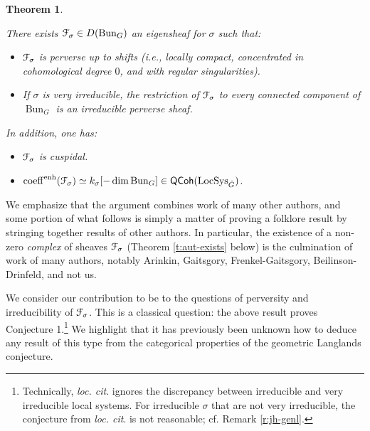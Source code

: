 \documentclass[reqno,11pt]{amsart}
\numberwithin{equation}{subsection}
\newtheorem{thm}{Theorem}[subsubsection]
\theoremstyle{remark}
\newcommand{\sF}{{\EuScript F}}
\newcommand{\on}{\operatorname}
\newcommand{\Bun}{\on{Bun}}
\newcommand{\LocSys}{\on{LocSys}}
\newcommand{\QCoh}{\mathsf{QCoh}}
\newcommand{\coeff}{\on{coeff}}
\newcommand{\enh}{\on{enh}}
\begin{document}
\begin{thm}\label{t:eigensheaf}

There exists $\sF_{\sigma} \in D(\Bun_G)$ an eigensheaf for
$\sigma$ such that:

\begin{itemize}

\item $\sF_{\sigma}$ is perverse up to shifts 
(i.e., locally compact, concentrated in cohomological degree $0$, and 
with regular singularities).

\item If $\sigma$ is very irreducible, 
the restriction of $\sF_{\sigma}$ to every connected component of $\Bun_G$
is an irreducible perverse sheaf.

\end{itemize}

In addition, one has:

\begin{itemize}

\item $\sF_{\sigma}$ is cuspidal.

\item $\coeff^{\enh}(\sF_{\sigma}) \simeq k_{\sigma}[-\dim \Bun_G] 
\in \QCoh(\LocSys_{\check{G}})$.

\end{itemize}

\end{thm}

We emphasize that the argument combines work of many other authors, and some portion of what follows is simply a matter
of proving a folklore result by stringing together results
of other authors.
In particular, the existence of a non-zero \emph{complex} of sheaves $\sF_{\sigma}$ (Theorem \ref{t:aut-exists} below)
is the culmination of work of many authors, notably Arinkin, Gaitsgory, Frenkel-Gaitsgory,
Beilinson-Drinfeld, and not us. 

We consider our contribution to be to the questions of perversity and 
irreducibility of $\sF_{\sigma}$. This is a classical question: the above
result proves \cite{frenkel-survey} Conjecture 1.\footnote{Technically,
\emph{loc. cit}. ignores the discrepancy between irreducible
and very irreducible local systems. For irreducible $\sigma$ that
are not very irreducible, the conjecture from 
\emph{loc. cit}. is not reasonable; cf. Remark \ref{r:jh-genl}.}
We highlight that it has previously been unknown how to deduce
any result of this type from the categorical properties
of the geometric Langlands conjecture.
\end{document}

